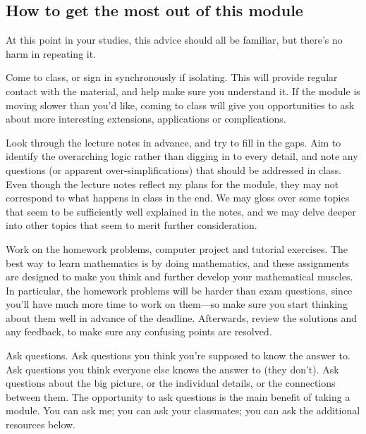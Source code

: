 \subsection*{How to get the most out of this module}
At this point in your studies, this advice should all be familiar, but there's no harm in repeating it.

Come to class, or sign in synchronously if isolating.
This will provide regular contact with the material, and help make sure you understand it.
If the module is moving slower than you'd like, coming to class will give you opportunities to ask about more interesting extensions, applications or complications.

Look through the lecture notes in advance, and try to fill in the gaps.
Aim to identify the overarching logic rather than digging in to every detail, and note any questions (or apparent over-simplifications) that should be addressed in class.
Even though the lecture notes reflect my plans for the module, they may not correspond to what happens in class in the end.
We may gloss over some topics that seem to be sufficiently well explained in the notes, and we may delve deeper into other topics that seem to merit further consideration.

Work on the homework problems, computer project and tutorial exercises.
The best way to learn mathematics is by doing mathematics, and these assignments are designed to make you think and further develop your mathematical muscles.
In particular, the homework problems will be harder than exam questions, since you'll have much more time to work on them---so make sure you start thinking about them well in advance of the deadline.
Afterwards, review the solutions and any feedback, to make sure any confusing points are resolved.

Ask questions.
Ask questions you think you're supposed to know the answer to.
Ask questions you think everyone else knows the answer to (they don't).
Ask questions about the big picture, or the individual details, or the connections between them.
The opportunity to ask questions is the main benefit of taking a module.
You can ask me; you can ask your classmates; you can ask the additional resources below.


